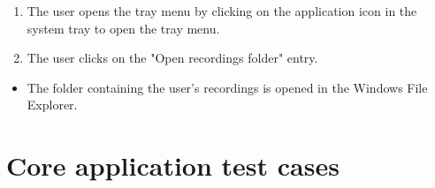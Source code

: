 \begin{tests}
    {\begin{enumerate}
        \item The \gls{user} opens the tray menu by clicking on the application icon in the system tray to open the tray menu.
        \item The \gls{user} clicks on the "Open recordings folder" entry.
    \end{enumerate}}
    {\begin{itemize}
        \item The folder containing the \gls{user}'s recordings is opened in the Windows File Explorer.
    \end{itemize}}
\end{tests}

\section{Core application test cases}
